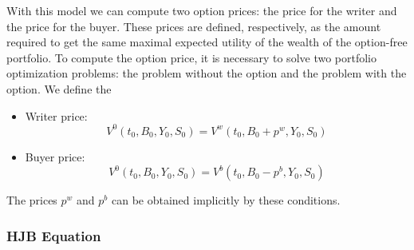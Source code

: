With this model we can compute two option prices: the price for the writer and the price for the buyer.
These prices are defined, respectively, as the amount required to get the same maximal expected utility of the wealth of 
the option-free portfolio.
To compute the option price, 
it is necessary to solve two portfolio optimization problems: the problem without the option
and the problem with the option.
We define the 
\begin{itemize}
 \item Writer price:
 \begin{equation}\label{writer_p}
  V^0(t_0,B_0,Y_0,S_0) = V^w(t_0,B_0+p^w,Y_0,S_0)
 \end{equation}
 \item Buyer price:
 \begin{equation}\label{buyer_p}
  V^0(t_0,B_0,Y_0,S_0) = V^b(t_0,B_0-p^b,Y_0,S_0)
 \end{equation}
\end{itemize}
The prices $p^w$ and $p^b$ can be obtained implicitly by these conditions.


\subsubsection{HJB Equation}\label{subsec_HJB}

